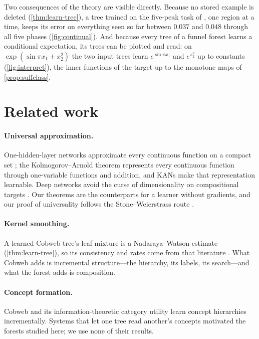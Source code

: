 Two consequences of the theory are visible directly.  Because no stored example is deleted
(\cref{thm:learn-tree}), a tree trained on the five-peak task of \citet[Fig.~3.4]{liu2024kan}, one
region at a time, keeps its error on everything seen so far between $0.037$ and $0.048$ through
all five phases (\cref{fig:continual}).  And because every tree of a funnel forest learns a
conditional expectation, its trees can be plotted and read: on $\exp(\sin\pi x_1+x_2^2)$ the
two input trees learn $e^{\sin\pi x_1}$ and $e^{x_2^2}$ up to constants (\cref{fig:interpret}),
the inner functions of the target up to the monotone maps of \cref{prop:suffclass}.

\section{Related work}\label{sec:related}

\paragraph{Universal approximation.}  One-hidden-layer networks approximate every
continuous function on a compact set \citep{cybenko1989,hornik1989}; the
Kolmogorov--Arnold theorem \citep{kolmogorov1957,arnold1957,lorentz1966,sprecher1965}
represents every continuous function through one-variable functions and addition, and
KANs \citep{liu2024kan} make that representation learnable.  Deep networks avoid the curse of
dimensionality on compositional targets \citep{poggio2017}.  Our theorems are the
counterparts for a learner without gradients, and our proof of universality follows the
Stone--Weierstrass route \citep{stone1948}.

\paragraph{Kernel smoothing.}  A learned Cobweb tree's leaf mixture is a Nadaraya--Watson
estimate (\cref{thm:learn-tree}), so its consistency and rates come from that literature
\citep{devroye1989,gyorfi2002,wand1995}.  What Cobweb adds is incremental structure---the
hierarchy, its labels, its search---and what the forest adds is composition.

\paragraph{Concept formation.}  Cobweb \citep{fisher1987} and its information-theoretic
category utility \citep{corter1992,maclellan2026rational} learn concept hierarchies
incrementally.  Systems that let one tree read another's concepts
\citep{maclellan2021conv,singaravadivelan2026trellis} motivated the forests studied here; we
use none of their results.


